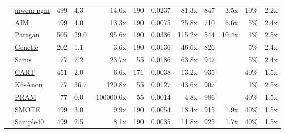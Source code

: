 \begin{table}
\begin{tabular}{llrlr@{\hskip 10pt}r@{\hskip 6pt}l@{\hskip 6pt}r@{\hskip 10pt}r@{\hskip 6pt}r@{\hskip 6pt}r@{\hskip 6pt}r}
        \cellcolor{ForestGreen} & \href{https://htmlpreview.github.io/?https://github.com/yoid2000/sdnist-summary/blob/main/results/mwem_pgm/report.html}{mwem-pgm} & 499 & 4.3 & 14.0x & 190 & 0.0237 & 81.3x & 847 & 3.5x & 10\% & 2.2x \\
        \cellcolor{ForestGreen} & \href{https://htmlpreview.github.io/?https://github.com/yoid2000/sdnist-summary/blob/main/results/aim_e_10_all/report.html}{AIM} & 499 & 4.0 & 13.3x & 190 & 0.0075 & 25.8x & 710 & 6.6x & 5\% & 2.4x \\
        \cellcolor{ForestGreen} & \href{https://htmlpreview.github.io/?https://github.com/yoid2000/sdnist-summary/blob/main/results/pategan_n_iter_50_e_10_all/report.html}{Pategan} & 505 & 29.0 & 95.6x & 190 & 0.0336 & 115.2x & 544 & 10.4x & 1\% & 2.5x \\
        \cellcolor{YellowGreen} & \href{https://htmlpreview.github.io/?https://github.com/yoid2000/sdnist-summary/blob/main/results/genetic_sd_e_10_simple/report.html}{Genetic} & 202 & 1.1 & 3.6x & 190 & 0.0136 & 46.6x & 826 &   & 5\% & 2.4x \\
        \cellcolor{YellowGreen} & \href{https://htmlpreview.github.io/?https://github.com/yoid2000/sdnist-summary/blob/main/results/sarus_sdg_demographic/report.html}{Sarus} & 77 & 7.2 & 23.7x & 55 & 0.0186 & 63.8x & 947 &   & 5\% & 2.4x \\
        \cellcolor{SkyBlue} & \href{https://htmlpreview.github.io/?https://github.com/yoid2000/sdnist-summary/blob/main/results/cart_cf21/report.html}{CART} & 451 & 2.0 & 6.6x & 171 & 0.0038 & 13.2x & 935 &   & 40\% & 1.5x \\
        \cellcolor{Salmon} & \href{https://htmlpreview.github.io/?https://github.com/yoid2000/sdnist-summary/blob/main/results/k_anonymity_k_6/report.html}{K6-Anon} & 77 & 36.7 & 120.8x & 55 & 0.0127 & 43.6x & 907 &   & 1\% & 2.5x \\
        \cellcolor{Goldenrod} & \href{https://htmlpreview.github.io/?https://github.com/yoid2000/sdnist-summary/blob/main/results/pram_default/report.html}{PRAM} & 77 & 0.0 & -100000.0x & 55 & 0.0014 & 4.8x & 986 &   & 40\% & 1.5x \\
        \cellcolor{Tan} & \href{https://htmlpreview.github.io/?https://github.com/yoid2000/sdnist-summary/blob/main/results/smote_target_marital/report.html}{SMOTE} & 499 & 3.0 & 9.9x & 190 & 0.0054 & 18.4x & 915 & 1.9x & 40\% & 1.5x \\
        \cellcolor{Sepia} & \href{https://htmlpreview.github.io/?https://github.com/yoid2000/sdnist-summary/blob/main/results/subsample_40pcnt_all/report.html}{Sample40} & 499 & 2.5 & 8.1x & 190 & 0.0035 & 11.8x & 925 & 1.7x & 40\% & 1.5x \\
        \bottomrule
    \end{tabular}
\end{table}
